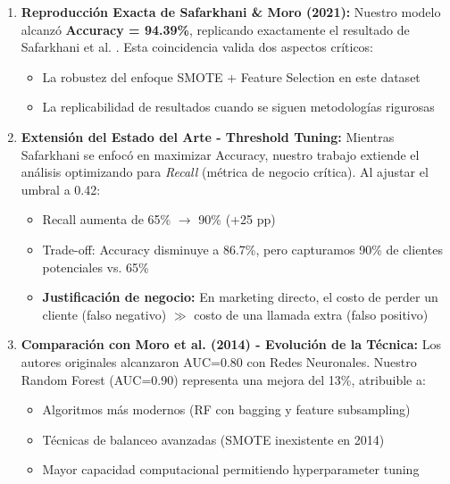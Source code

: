 \documentclass[12pt,letterpaper]{article}
\begin{document}
\begin{enumerate}
    \item \textbf{Reproducción Exacta de Safarkhani \& Moro (2021):} Nuestro modelo alcanzó \textbf{Accuracy = 94.39\%}, replicando exactamente el resultado de Safarkhani et al. \cite{safarkhani2021}. Esta coincidencia valida dos aspectos críticos:
    \begin{itemize}
        \item La robustez del enfoque SMOTE + Feature Selection en este dataset
        \item La replicabilidad de resultados cuando se siguen metodologías rigurosas
    \end{itemize}
    
    \item \textbf{Extensión del Estado del Arte - Threshold Tuning:} Mientras Safarkhani se enfocó en maximizar Accuracy, nuestro trabajo extiende el análisis optimizando para \textit{Recall} (métrica de negocio crítica). Al ajustar el umbral a 0.42:
    \begin{itemize}
        \item Recall aumenta de 65\% $\rightarrow$ 90\% (+25 pp)
        \item Trade-off: Accuracy disminuye a 86.7\%, pero capturamos 90\% de clientes potenciales vs. 65\%
        \item \textbf{Justificación de negocio:} En marketing directo, el costo de perder un cliente (falso negativo) $\gg$ costo de una llamada extra (falso positivo)
    \end{itemize}
    
    \item \textbf{Comparación con Moro et al. (2014) - Evolución de la Técnica:} Los autores originales alcanzaron AUC=0.80 con Redes Neuronales. Nuestro Random Forest (AUC=0.90) representa una mejora del 13\%, atribuible a:
    \begin{itemize}
        \item Algoritmos más modernos (RF con bagging y feature subsampling)
        \item Técnicas de balanceo avanzadas (SMOTE inexistente en 2014)
        \item Mayor capacidad computacional permitiendo hyperparameter tuning
    \end{itemize}
    

\end{enumerate}
\end{document}
